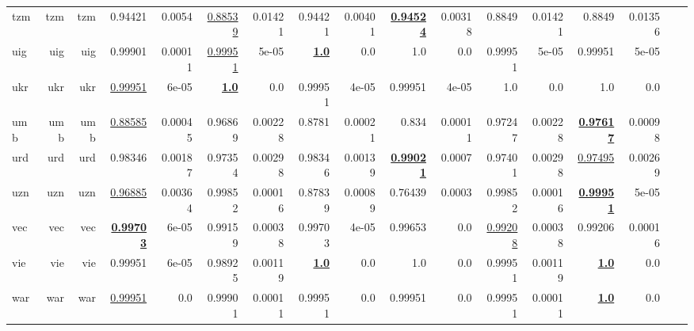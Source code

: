 \documentclass[11pt]{article}
\begin{document}
\begin{table*}[h]
{\begin{tabular}{lrrrrrrrrrrrrrrrr}
tzm         & tzm         & tzm         & 0.94421         & 0.0054         & \underline{0.88539}         & 0.01421         & 0.94421         & 0.00401         & \textbf{\underline{0.94524}}         & 0.00318         & 0.8849         & 0.01421         & 0.8849         & 0.01356         \\
uig         & uig         & uig         & 0.99901         & 0.00011         & \underline{0.99951}         & 5e-05         & \textbf{\underline{1.0}}         & 0.0         & 1.0         & 0.0         & 0.99951         & 5e-05         & 0.99951         & 5e-05         \\
ukr         & ukr         & ukr         & \underline{0.99951}         & 6e-05         & \textbf{\underline{1.0}}         & 0.0         & 0.99951         & 4e-05         & 0.99951         & 4e-05         & 1.0         & 0.0         & 1.0         & 0.0         \\
umb         & umb         & umb         & \underline{0.88585}         & 0.00045         & 0.96869         & 0.00228         & 0.8781         & 0.00021         & 0.834         & 0.00011         & 0.97247         & 0.00228         & \textbf{\underline{0.97617}}         & 0.00098         \\
urd         & urd         & urd         & 0.98346         & 0.00187         & 0.97354         & 0.00298         & 0.98346         & 0.00139         & \textbf{\underline{0.99021}}         & 0.0007         & 0.97401         & 0.00298         & \underline{0.97495}         & 0.00269         \\
uzn         & uzn         & uzn         & \underline{0.96885}         & 0.00364         & 0.99852         & 0.00016         & 0.87839         & 0.00089         & 0.76439         & 0.0003         & 0.99852         & 0.00016         & \textbf{\underline{0.99951}}         & 5e-05         \\
vec         & vec         & vec         & \textbf{\underline{0.99703}}         & 6e-05         & 0.99159         & 0.00038         & 0.99703         & 4e-05         & 0.99653         & 0.0         & \underline{0.99208}         & 0.00038         & 0.99206         & 0.00016         \\
vie         & vie         & vie         & 0.99951         & 6e-05         & 0.98925         & 0.00119         & \textbf{\underline{1.0}}         & 0.0         & 1.0         & 0.0         & 0.99951         & 0.00119         & \textbf{\underline{1.0}}         & 0.0         \\
war         & war         & war         & \underline{0.99951}         & 0.0         & 0.99901         & 0.00011         & 0.99951         & 0.0         & 0.99951         & 0.0         & 0.99951         & 0.00011         & \textbf{\underline{1.0}}         & 0.0         \\

\end{tabular}}
\end{table*}
\end{document}
